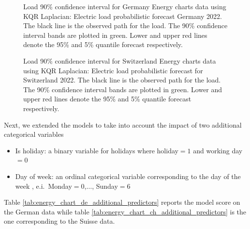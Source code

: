     \begin{figure}[!ht]
        \caption[Probabilistic forecast for load in Germany]{Load 90\% confidence interval for Germany Energy charts data using KQR Laplacian: \small \textmd{Electric load probabilistic forecast Germany 2022. The black line is the observed path for the load. The 90\% confidence interval bands are plotted in green. Lower and upper red lines denote the 95\% and 5\% quantile forecast respectively.}}
        \label{fig:DE_load_CI}
    \end{figure}
    

    \begin{figure}[!ht]
        \caption[Probabilistic forecast for load in Switzerland]{Load 90\% confidence interval for Switzerland Energy charts data using KQR Laplacian: \small \textmd{Electric load probabilistic forecast for Switzerland 2022. The black line is the observed path for the load. The 90\% confidence interval bands are plotted in green. Lower and upper red lines denote the 95\% and 5\% quantile forecast respectively.}}
        \label{fig:CH_load_CI}
    \end{figure}
    
Next, we extended the models to take into account the impact of two additional categorical variables
\begin{itemize}
    \item Is holiday: a binary variable for holidays where holiday$=1$ and working day$=0$
    \item Day of week: an ordinal categorical variable corresponding to the day of the week , e.i.\ Monday$=0$,$\dots$, Sunday$=6$
\end{itemize}
Table \ref{tab:energy_chart_de_additional_predictors} reports the model score on the German data while table \ref{tab:energy_chart_ch_additional_predictors} is the one corresponding to the Suisse data.

